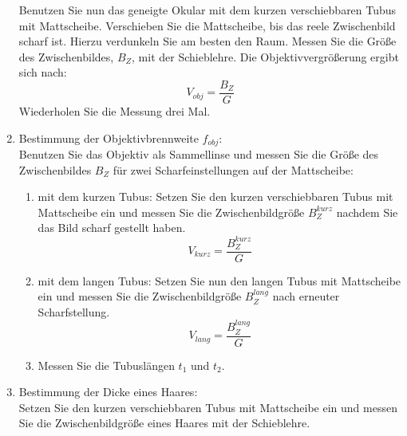 \begin{enumerate}
	Benutzen Sie nun das geneigte Okular mit dem kurzen verschiebbaren Tubus mit Mattscheibe. Verschieben Sie die Mattscheibe, bis das reele Zwischenbild scharf ist. Hierzu verdunkeln Sie am besten den Raum. Messen Sie die Größe des Zwischenbildes, $B_Z$, mit der Schieblehre. Die Objektivvergrößerung ergibt sich nach:
  \[
  V_{obj} = \frac{B_Z}{G}
  \]
  Wiederholen Sie die Messung drei Mal.
 \item Bestimmung der Objektivbrennweite $f_{obj}$:\\
  Benutzen Sie das Objektiv als Sammellinse und messen Sie die Größe des Zwischenbildes $B_Z$ für zwei Scharfeinstellungen auf der Mattscheibe:
  \begin{enumerate}
   \item mit dem kurzen Tubus: Setzen Sie den kurzen verschiebbaren Tubus mit Mattscheibe ein und messen Sie die Zwischenbildgröße $B_Z^{kurz}$ nachdem Sie das Bild scharf gestellt haben.
    \[
     V_{kurz} = \frac{B_Z^{kurz}}{G}
    \]
   \item mit dem langen Tubus: Setzen Sie nun den langen Tubus mit Mattscheibe ein und messen Sie die Zwischenbildgröße $B_Z^{lang}$ nach erneuter Scharfstellung.
    \[
     V_{lang} = \frac{B_Z^{lang}}{G}
    \]
   \item Messen Sie die Tubuslängen $t_1$ und $t_2$.
  \end{enumerate}
 \item Bestimmung der Dicke eines Haares:\\
  Setzen Sie den kurzen verschiebbaren Tubus mit Mattscheibe ein und messen Sie die Zwischenbildgröße eines Haares mit der Schieblehre. 
\end{enumerate}

